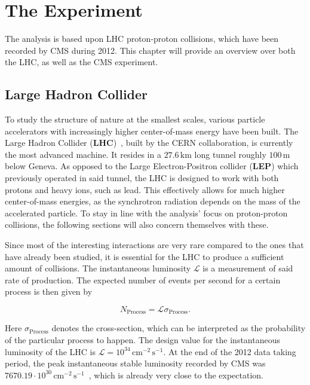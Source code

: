 \chapter{The Experiment}
\label{cha:experiment}

The analysis is based upon LHC proton-proton collisions, which have been recorded by CMS during 2012. This chapter will provide an overview over both the LHC, as well as the CMS experiment.


\section{Large Hadron Collider}
\label{sec:lhc} 

To study the structure of nature at the smallest scales, various particle accelerators with increasingly higher center-of-mass energy have been built. The Large Hadron Collider (\textbf{LHC})~\cite{lhcjinst}, built by the CERN collaboration, is currently the most advanced machine. It resides in a $27.6\,\text{km}$ long tunnel roughly $100\,\text{m}$ below Geneva. As opposed to the Large Electron-Positron collider (\textbf{LEP}) which previously operated in said tunnel, the LHC is designed to work with both protons and heavy ions, such as lead. This effectively allows for much higher center-of-mass energies, as the synchrotron radiation depends on the mass of the accelerated particle. To stay in line with the analysis' focus on proton-proton collisions, the following sections will also concern themselves with these.

Since most of the interesting interactions are very rare compared to the ones that have already been studied, it is essential for the LHC to produce a sufficient amount of collisions. The instantaneous luminosity $\mathcal{L}$ is a measurement of said rate of production. The expected number of events per second for a certain process is then given by

\begin{equation}
  \label{eq:instlumi}
  N_{\text{Process}} = \mathcal{L} \sigma_{\text{Process}}.
\end{equation}

\noindent Here $\sigma_{\text{Process}}$ denotes the cross-section, which can be interpreted as the probability of the particular process to happen. The design value for the instantaneous luminosity of the LHC is $\mathcal{L} = 10^{34}\,\text{cm}^{-2}\,\text{s}^{-1}$. At the end of the 2012 data taking period, the peak instantaneous stable luminosity recorded by CMS was $7670.19 \cdot 10^{30}\,\text{cm}^{-2}\,\text{s}^{-1}$~\cite{cmslumi}, which is already very close to the expectation.

